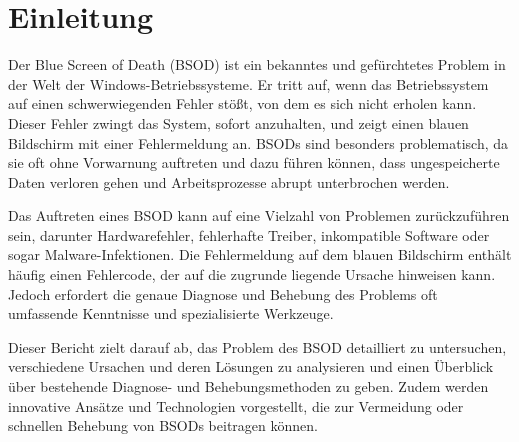 \documentclass[paper=a4,fontsize=12pt,ngerman,parskip=half]{scrartcl}
\begin{document}
\clearpage
\tableofcontents

\clearpage
{}

\section{Einleitung}

Der Blue Screen of Death (BSOD) ist ein bekanntes und gefürchtetes Problem in der Welt der Windows-Betriebssysteme. Er tritt auf, wenn das Betriebssystem auf einen schwerwiegenden Fehler stößt, von dem es sich nicht erholen kann. Dieser Fehler zwingt das System, sofort anzuhalten, und zeigt einen blauen Bildschirm mit einer Fehlermeldung an. BSODs sind besonders problematisch, da sie oft ohne Vorwarnung auftreten und dazu führen können, dass ungespeicherte Daten verloren gehen und Arbeitsprozesse abrupt unterbrochen werden.

Das Auftreten eines BSOD kann auf eine Vielzahl von Problemen zurückzuführen sein, darunter Hardwarefehler, fehlerhafte Treiber, inkompatible Software oder sogar Malware-Infektionen. Die Fehlermeldung auf dem blauen Bildschirm enthält häufig einen Fehlercode, der auf die zugrunde liegende Ursache hinweisen kann. Jedoch erfordert die genaue Diagnose und Behebung des Problems oft umfassende Kenntnisse und spezialisierte Werkzeuge.\cite{microsoft_support}

Dieser Bericht zielt darauf ab, das Problem des BSOD detailliert zu untersuchen, verschiedene Ursachen und deren Lösungen zu analysieren und einen Überblick über bestehende Diagnose- und Behebungsmethoden zu geben. Zudem werden innovative Ansätze und Technologien vorgestellt, die zur Vermeidung oder schnellen Behebung von BSODs beitragen können.
\end{document}
